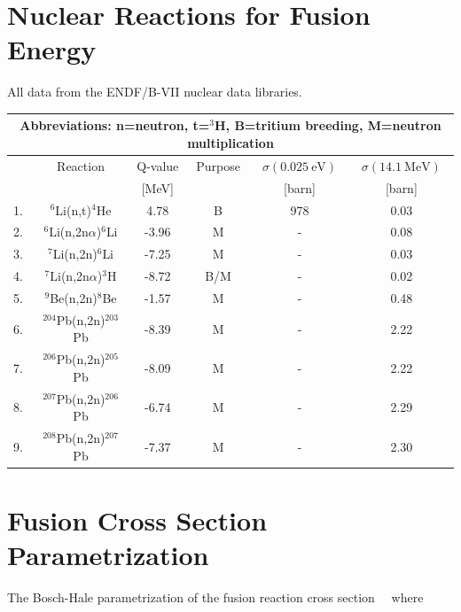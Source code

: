 \section{Nuclear Reactions for Fusion Energy}
\noindent
All data from the ENDF/B-VII nuclear data libraries.\cite{chadwick}
\begin{table}[h!]\small
  \centering
  \begin{tabular}{l c c c c c}
    \multicolumn{6}{c}{Abbreviations: n=neutron, t=$^3$H, B=tritium breeding, M=neutron multiplication}\\
    \hline
    & Reaction \T\B & Q-value & Purpose & $\sigma(0.025\mathrm{~eV})$ & $\sigma(14.1\mathrm{~MeV})$ \\[5pt]
    &               & [MeV]   &         & [barn]                          & [barn] \\[5pt]
    \hline\hline
    1. \T& $^6$Li(n,t)$^4$He           &  4.78  & B   & 978   & 0.03\\[5pt]
    2.   & $^6$Li(n,2n$\alpha$)$^6$Li  & -3.96  & M   & -     & 0.08\\[5pt]
    3.   & $^7$Li(n,2n)$^6$Li          & -7.25  & M   & -     & 0.03\\[5pt]
    4.   & $^7$Li(n,2n$\alpha$)$^3$H   & -8.72  & B/M & -     & 0.02\\[5pt]
    5.   & $^9$Be(n,2n)$^8$Be          & -1.57  & M   & -     & 0.48\\[5pt]
    6.   & $^{204}$Pb(n,2n)$^{203}$Pb  & -8.39  & M   & -     & 2.22\\[5pt]
    7.   & $^{206}$Pb(n,2n)$^{205}$Pb  & -8.09  & M   & -     & 2.22\\[5pt]
    8.   & $^{207}$Pb(n,2n)$^{206}$Pb  & -6.74  & M   & -     & 2.29\\[5pt]
    9. \B& $^{208}$Pb(n,2n)$^{207}$Pb  & -7.37  & M   & -     & 2.30\\[5pt]
    \hline
  \end{tabular}
  \label{breederReactions}
\end{table}

\vfill

\pagebreak
{}
\section{Fusion Cross Section Parametrization}
The Bosch-Hale parametrization of the fusion reaction cross section~~\cite{bosch}
\indent
where

